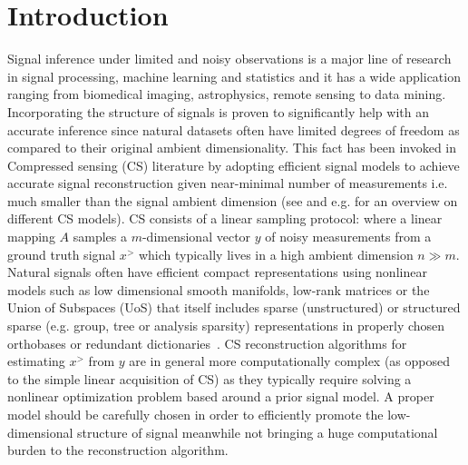 \section{Introduction}  
Signal inference under limited and noisy observations is a major line of research in signal processing, machine learning and statistics and it has a wide application ranging from biomedical imaging, astrophysics, remote sensing  to data mining. %
Incorporating the structure of signals is proven to significantly help with an accurate inference since natural datasets often have limited degrees of freedom as compared to their original ambient dimensionality. This fact has been invoked in Compressed sensing (CS)  literature by adopting efficient signal models to achieve accurate signal reconstruction given near-minimal number of measurements i.e. much smaller than the signal ambient dimension (see \cite{DonohoCS, CRT:CS,Tropp:SOMP1,Candes:EMC,BW:manifold,modelbasedCS} and e.g. \cite{RichCSreview} for an overview on different CS models). 
CS consists of a linear sampling protocol:
where a linear mapping $A$ samples a $m$-dimensional vector $y$ of noisy measurements from a ground truth signal $x^\gt$ which typically lives in a high ambient dimension $n\gg m$. Natural signals often have efficient compact representations using nonlinear models such as low dimensional smooth manifolds, low-rank matrices or the Union of Subspaces (UoS) that itself includes sparse (unstructured) or structured sparse (e.g. group, tree or analysis sparsity) representations in properly chosen orthobases or redundant dictionaries~\cite{RichCSreview}.
CS reconstruction algorithms for estimating $x^\gt$ from $y$ are in general more computationally complex (as opposed to the simple linear acquisition of CS) as they typically require solving a nonlinear optimization problem based around a prior signal model.  %
 A proper model should be carefully chosen in order to efficiently promote the low-dimensional structure of signal meanwhile not bringing a huge computational burden to the reconstruction algorithm.
 

